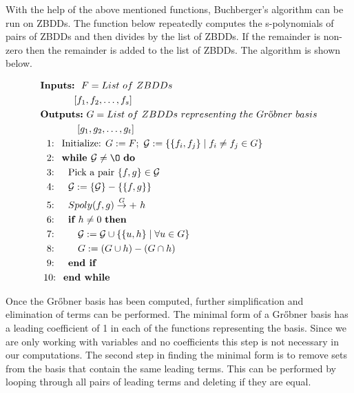 \documentclass[letterpaper, 10 pt, conference]{ieeeconf}
\begin{document}
With the help of the above mentioned functions, Buchberger's algorithm can be run on ZBDDs.  The function below repeatedly computes the s-polynomials of pairs of ZBDDs and then divides by the list of ZBDDs.  If the remainder is non-zero then the remainder is added to the list of ZBDDs.  The algorithm is shown below. 
{\small
\begin{align*}
&\textbf{Inputs:}\ \ F = List\ of\ ZBDDs \\
&\ \ \ \ \ \ \ \ \ \ \left[ f_{1},f_{2},\ldots ,f_s \right] \\
&\textbf{Outputs:}\ G = List\ of\ ZBDDs\ representing\ the\ Gr\text{{\H o}}bner\ basis \\
&\ \ \ \ \ \ \ \ \ \ \ \left[ g_{1},g_{2},\ldots ,g_t \right]\\
&\ \ \text{1: }\ \text{Initialize: } G:=F;\ \mathcal{G}:=\{\{f_i , f_j\} \mid f_i \not= f_j \in G\} \\  
&\ \ \text{2: }\ \textbf{while } \mathcal{G} \not= {\O}\ \textbf{do} \\
&\ \ \text{3: }\ \ \ \text{Pick a pair } \{ f, g\} \in \mathcal{G} \\
&\ \ \text{4: }\ \ \ \mathcal{G} := \{ \mathcal{G} \} - \{\{f,g\}\} \\
&\ \ \text{5: }\ \ \ Spoly(f,g)\overset{G}{\to} +\ h \\
&\ \ \text{6: }\ \ \ \textbf{if } h \not= 0\ \textbf{then} \\
&\ \ \text{7: }\ \ \ \ \ \ \mathcal{G} := \mathcal{G} \cup \{\{u,h\} \mid \forall u \in G\} \\ 
&\ \ \text{8: }\ \ \ \ \ \ G := \left( G \cup h \right) - \left( G \cap h \right) \\
&\ \ \text{9: }\ \ \ \textbf{end if} \\
&\ \text{10: }\ \textbf{end while} \\
\end{align*}
\par}

Once the Gr{\H o}bner basis has been computed, further simplification and elimination of terms can be performed.  The minimal form of a Gr{\H o}bner basis has a leading coefficient of 1 in each of the functions representing the basis.  Since we are only working with variables and no coefficients this step is not necessary in our computations.  The second step in finding the minimal form is to remove sets from the basis that contain the same leading terms.  This can be performed by looping through all pairs of leading terms and deleting if they are equal.
\end{document}
